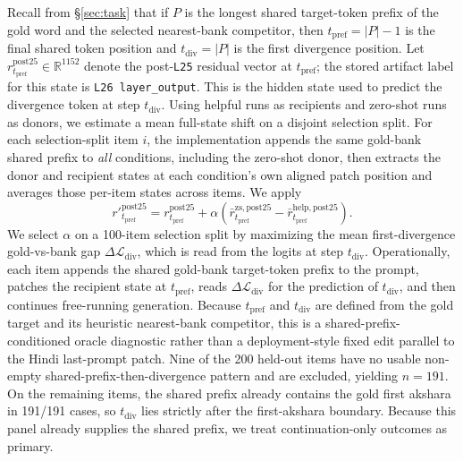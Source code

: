 \documentclass{article}
\begin{document}
Recall from \S\ref{sec:task} that if $P$ is the longest shared target-token prefix of the gold word and the selected nearest-bank competitor, then $t_{\mathrm{pref}} = |P|-1$ is the final shared token position and $t_{\mathrm{div}} = |P|$ is the first divergence position. Let $r^{\mathrm{post25}}_{t_{\mathrm{pref}}} \in \mathbb{R}^{1152}$ denote the post-\texttt{L25} residual vector at $t_{\mathrm{pref}}$; the stored artifact label for this state is \texttt{L26 layer\_output}. This is the hidden state used to predict the divergence token at step $t_{\mathrm{div}}$. Using helpful runs as recipients and zero-shot runs as donors, we estimate a mean full-state shift on a disjoint selection split. For each selection-split item $i$, the implementation appends the same gold-bank shared prefix to \emph{all} conditions, including the zero-shot donor, then extracts the donor and recipient states at each condition's own aligned patch position and averages those per-item states across items. We apply
\begin{equation}
r'^{\mathrm{post25}}_{t_{\mathrm{pref}}} = r^{\mathrm{post25}}_{t_{\mathrm{pref}}} + \alpha\left(\bar r^{\mathrm{zs,post25}}_{t_{\mathrm{pref}}} - \bar r^{\mathrm{help,post25}}_{t_{\mathrm{pref}}}\right).
\end{equation}
We select $\alpha$ on a 100-item selection split by maximizing the mean first-divergence gold-vs-bank gap $\Delta \mathcal{L}_{\mathrm{div}}$, which is read from the logits at step $t_{\mathrm{div}}$. Operationally, each item appends the shared gold-bank target-token prefix to the prompt, patches the recipient state at $t_{\mathrm{pref}}$, reads $\Delta \mathcal{L}_{\mathrm{div}}$ for the prediction of $t_{\mathrm{div}}$, and then continues free-running generation. Because $t_{\mathrm{pref}}$ and $t_{\mathrm{div}}$ are defined from the gold target and its heuristic nearest-bank competitor, this is a shared-prefix-conditioned oracle diagnostic rather than a deployment-style fixed edit parallel to the Hindi last-prompt patch. Nine of the 200 held-out items have no usable non-empty shared-prefix-then-divergence pattern and are excluded, yielding $n{=}191$. On the remaining items, the shared prefix already contains the gold first akshara in 191/191 cases, so $t_{\mathrm{div}}$ lies strictly after the first-akshara boundary. Because this panel already supplies the shared prefix, we treat continuation-only outcomes as primary.
\end{document}
